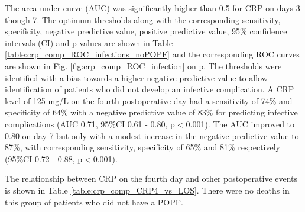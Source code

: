 The area under curve (AUC) was significantly higher than 0.5 for CRP on days 3 though 7. The optimum thresholds along with the corresponding sensitivity, specificity, negative predictive value, positive predictive value, 95\% confidence intervals (CI) and p-values are shown in Table \ref{table:crp_comp_ROC_infections_noPOPF} and the corresponding ROC curves are shown in Fig. \ref{fig:crp_comp_ROC_infection} on p\pageref{fig:crp_comp_ROC_infection}. The thresholds were identified with a bias towards a higher negative predictive value to allow identification of patients who did not develop an infective complication. A CRP level of 125 mg/L on the fourth postoperative day had a sensitivity of 74\% and specificity of 64\% with a negative predictive value of 83\% for predicting infective complications (AUC 0.71, 95\%CI 0.61 - 0.80, p$<$0.001). The AUC improved to 0.80 on day 7 but only with a modest increase in the negative predictive value to 87\%, with corresponding sensitivity, specificity of 65\% and 81\% respectively (95\%CI 0.72 - 0.88, p$<$0.001).

The relationship between CRP on the fourth day and other postoperative events is shown in Table \ref{table:crp_comp_CRP4_vs_LOS}. There were no deaths in this group of patients who did not have a POPF. 


